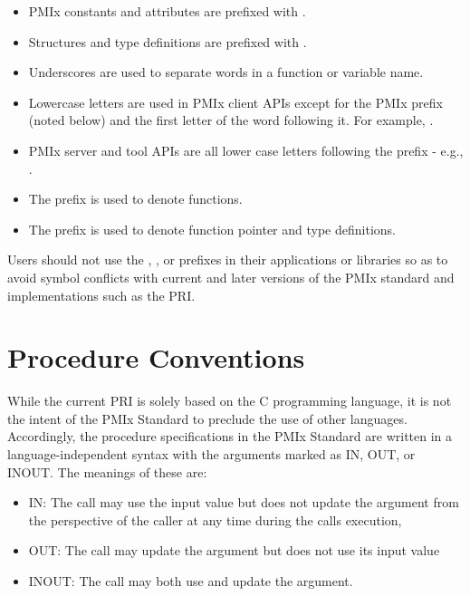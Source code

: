 \begin{itemize}
\item \ac{PMIx} constants and attributes are prefixed with \textbf{}.
\item Structures and type definitions are prefixed with .
\item Underscores are used to separate words in a function or variable name.
\item Lowercase letters are used in \ac{PMIx} client \acp{API} except for the \ac{PMIx} prefix (noted below) and the first letter of the word following it.
For example, .
\item \ac{PMIx} server and tool \acp{API} are all lower case letters following the prefix - e.g., .
\item The  prefix is used to denote functions.
\item The  prefix is used to denote function pointer and type definitions.
\end{itemize}

Users should not use the \textbf{}, \textbf{}, or \textbf{} prefixes in their applications or libraries so as to avoid symbol conflicts with current and later versions of the \ac{PMIx} standard and implementations such as the \ac{PRI}.

\section{Procedure Conventions}

While the current \acf{PRI} is solely based on the C programming language, it is not the intent of the \ac{PMIx} Standard to preclude the use of other languages.
Accordingly, the procedure specifications in the \ac{PMIx} Standard are written in a language-independent syntax with the arguments marked as IN, OUT, or INOUT.
The meanings of these are:
\begin{itemize}
\item IN:
The call may use the input value but does not update the argument from the perspective of the caller at any time during the calls execution,
\item OUT:
The call may update the argument but does not use its input value
\item INOUT:
The call may both use and update the argument.
\end{itemize}

